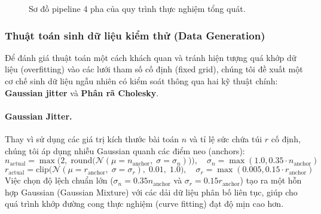\documentclass[fontsize=13pt,a4paper]{report}
\begin{document}
\begin{figure}[H]
    \centering
    \caption{Sơ đồ pipeline 4 pha của quy trình thực nghiệm tổng quát.}
    \label{fig:pipeline}
\end{figure}

\subsubsection{Thuật toán sinh dữ liệu kiểm thử (Data Generation)}
\label{subsubsec:datagen}

Để đánh giá thuật toán một cách khách quan và tránh hiện tượng quá khớp dữ liệu (overfitting) vào các lưới tham số cố định (fixed grid), chúng tôi đề xuất một cơ chế sinh dữ liệu ngẫu nhiên có kiểm soát thông qua hai kỹ thuật chính: \textbf{Gaussian jitter} và \textbf{Phân rã Cholesky}.

\paragraph{Gaussian Jitter.} Thay vì sử dụng các giá trị kích thước bài toán $n$ và tỉ lệ sức chứa túi $r$ cố định, chúng tôi áp dụng nhiễu Gaussian quanh các điểm neo (anchors):
\begin{equation}
    n_{\text{actual}} = \max\!\Big(2,\;\text{round}\big(\mathcal{N}(\mu = n_{\text{anchor}},\;\sigma = \sigma_n)\big)\Big), \quad \sigma_n = \max(1.0, 0.35 \cdot n_{\text{anchor}})
    \label{eq:jitter_n}
\end{equation}
\begin{equation}
    r_{\text{actual}} = \text{clip}\!\Big(\mathcal{N}(\mu = r_{\text{anchor}},\;\sigma = \sigma_r),\;0.01,\;1.0\Big), \quad \sigma_r = \max(0.005, 0.15 \cdot r_{\text{anchor}})
    \label{eq:jitter_ratio}
\end{equation}
Việc chọn độ lệch chuẩn lớn ($\sigma_n = 0.35n_{\text{anchor}}$ và $\sigma_r = 0.15r_{\text{anchor}}$) tạo ra một hỗn hợp Gaussian (Gaussian Mixture) với các dải dữ liệu phân bố liên tục, giúp cho quá trình khớp đường cong thực nghiệm (curve fitting) đạt độ mịn cao hơn.
\end{document}
